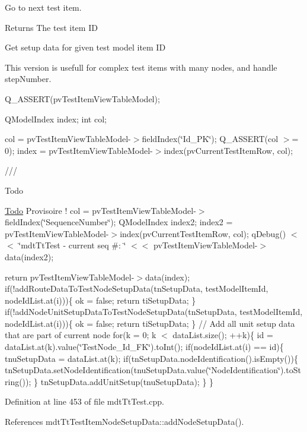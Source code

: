 Go to next test item. 

\begin{DoxyReturn}{Returns}
The test item I\-D
\end{DoxyReturn}
Get setup data for given test model item I\-D

This version is usefull for complex test items with many nodes, and handle step\-Number.

Q\-\_\-\-A\-S\-S\-E\-R\-T(pv\-Test\-Item\-View\-Table\-Model);

Q\-Model\-Index index; int col;

col = pv\-Test\-Item\-View\-Table\-Model-\/$>$field\-Index(\char`\"{}\-Id\-\_\-\-P\-K\char`\"{}); Q\-\_\-\-A\-S\-S\-E\-R\-T(col $>$= 0); index = pv\-Test\-Item\-View\-Table\-Model-\/$>$index(pv\-Current\-Test\-Item\-Row, col);

///\begin{DoxyRefDesc}{Todo}
\item[\hyperlink{todo__todo000081}{Todo}]Provisoire ! col = pv\-Test\-Item\-View\-Table\-Model-\/$>$field\-Index(\char`\"{}\-Sequence\-Number\char`\"{}); Q\-Model\-Index index2; index2 = pv\-Test\-Item\-View\-Table\-Model-\/$>$index(pv\-Current\-Test\-Item\-Row, col); q\-Debug() $<$$<$ \char`\"{}mdt\-Tt\-Test -\/ current seq \#\-: \char`\"{} $<$$<$ pv\-Test\-Item\-View\-Table\-Model-\/$>$data(index2);\end{DoxyRefDesc}


return pv\-Test\-Item\-View\-Table\-Model-\/$>$data(index); if(!add\-Route\-Data\-To\-Test\-Node\-Setup\-Data(tn\-Setup\-Data, test\-Model\-Item\-Id, node\-Id\-List.\-at(i)))\{ ok = false; return ti\-Setup\-Data; \} if(!add\-Node\-Unit\-Setup\-Data\-To\-Test\-Node\-Setup\-Data(tn\-Setup\-Data, test\-Model\-Item\-Id, node\-Id\-List.\-at(i)))\{ ok = false; return ti\-Setup\-Data; \} // Add all unit setup data that are part of current node for(k = 0; k $<$ data\-List.\-size(); ++k)\{ id = data\-List.\-at(k).value(\char`\"{}\-Test\-Node\-\_\-\-Id\-\_\-\-F\-K\char`\"{}).to\-Int(); if(node\-Id\-List.\-at(i) == id)\{ tnu\-Setup\-Data = data\-List.\-at(k); if(tn\-Setup\-Data.\-node\-Identification().is\-Empty())\{ tn\-Setup\-Data.\-set\-Node\-Identification(tnu\-Setup\-Data.\-value(\char`\"{}\-Node\-Identification\char`\"{}).to\-String()); \} tn\-Setup\-Data.\-add\-Unit\-Setup(tnu\-Setup\-Data); \} \} 

Definition at line 453 of file mdt\-Tt\-Test.\-cpp.



References mdt\-Tt\-Test\-Item\-Node\-Setup\-Data\-::add\-Node\-Setup\-Data().

